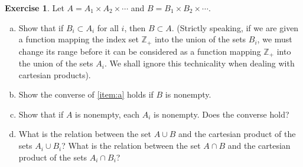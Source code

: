 \documentclass[11pt,a4paper,twoside]{article}
\theoremstyle{definition}
\newcounter{excounter}
\newtheorem{exercise}[excounter]{Exercise}
\begin{document}
\begin{exercise}

  Let $A = A_1 \times A_2 \times \dotsb$ and $B = B_1 \times B_2 \times \dotsb$.
  \begin{enumerate}[(a)]
  \item \label{item:a} Show that if $B_i \subset A_i$ for all $i$, then $B \subset A$. (Strictly speaking,
    if we are given a function mapping the index set $\mathbb{Z}_+$ into the union of the sets $B_i$,
    we must change its range before it can be considered as a function mapping $\mathbb{Z}_+$ into
    the union of the sets $A_i$. We shall ignore this technicality when dealing with cartesian products).
  \item Show the converse of \ref{item:a} holds if $B$ is nonempty.
  \item Show that if $A$ is nonempty, each $A_i$ is nonempty. Does the converse hold?
  \item What is the relation between the set $A \cup B$ and the cartesian product of the sets $A_i \cup B_i$?
    What is the relation between the set $A \cap B$ and the cartesian product of the sets $A_i \cap B_i$?
  \end{enumerate}

\end{exercise}
\end{document}
